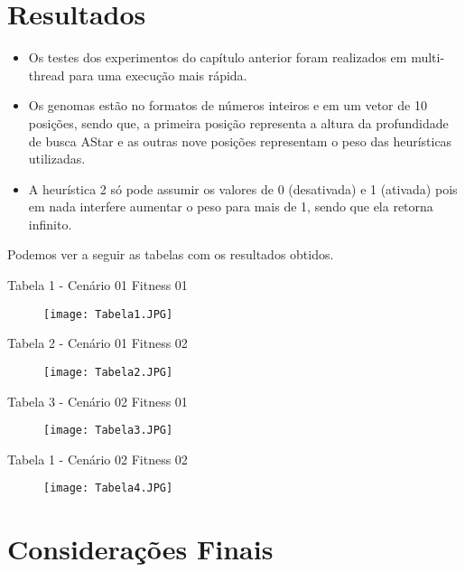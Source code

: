 \documentclass[12pt, a4paper, english, brazil]{abntex2}
\begin{document}
\chapter{Resultados}
\begin{itemize}
\item Os testes dos experimentos do capítulo anterior foram realizados em multi-thread para uma execução mais rápida. 
\item Os genomas estão no formatos de números inteiros e em um vetor de 10 posições, sendo que, a primeira posição representa a altura da profundidade de busca AStar e as outras nove posições representam o peso das heurísticas utilizadas.
\item A heurística 2 só pode assumir os valores de 0 (desativada) e 1 (ativada) pois em nada interfere aumentar o peso para mais de 1, sendo que ela retorna infinito. 
\end{itemize}
Podemos ver a seguir as tabelas com os resultados obtidos. 


\begin{centering}Tabela 1 - Cenário 01 Fitness 01
\begin{figure}[H]
\centering
\texttt{[image: Tabela1.JPG]}
\end{figure}
\end{centering}

\begin{centering}Tabela 2 - Cenário 01 Fitness 02
\begin{figure}[H]
\centering
\texttt{[image: Tabela2.JPG]}
\end{figure}
\end{centering}


\begin{centering}Tabela 3 - Cenário 02 Fitness 01
\begin{figure}[H]
\centering
\texttt{[image: Tabela3.JPG]}
\end{figure}
\end{centering}

\begin{centering}Tabela 1 - Cenário 02 Fitness 02
\begin{figure}[H]
\centering
\texttt{[image: Tabela4.JPG]}
\end{figure}
\end{centering}

\chapter{Considerações Finais}
\end{document}
